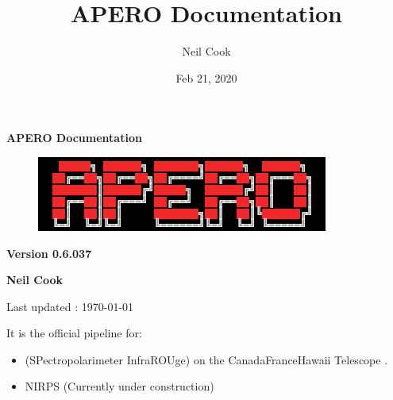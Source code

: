 \documentclass[a4paper,10pt,english]{report}
\title{APERO Documentation}
\date{Feb 21, 2020}
\author{Neil Cook}
\begin{document}
\pagestyle{empty}


        \begin{titlepage}
            \centering

            \vspace*{40mm} %
            \textbf{\Huge {APERO Documentation}}

            \vspace{5mm}
            \begin{figure}[!h]
                \centering
                \includegraphics[scale=1]{apero_logo.png}
            \end{figure}
            
            \vspace{5mm}
            \Large \textbf{Version 0.6.037}
            
            \vspace{5mm}
            \Large \textbf{{Neil Cook}}

            \vspace*{0mm}
            \small  Last updated : \MonthYearFormat\today


        \end{titlepage}

        \clearpage
        \tableofcontents

        
\pagestyle{plain}
 
\pagestyle{normal}
\label{\detokenize{index::doc}}


It is the official pipeline for:
\begin{itemize}
\item {} 
 (SPectropolarimeter InfraROUge) on the Canada\sphinxhyphen{}France\sphinxhyphen{}Hawaii Telescope .

\item {} 
NIRPS (Currently under construction)

\end{itemize}
\end{document}
